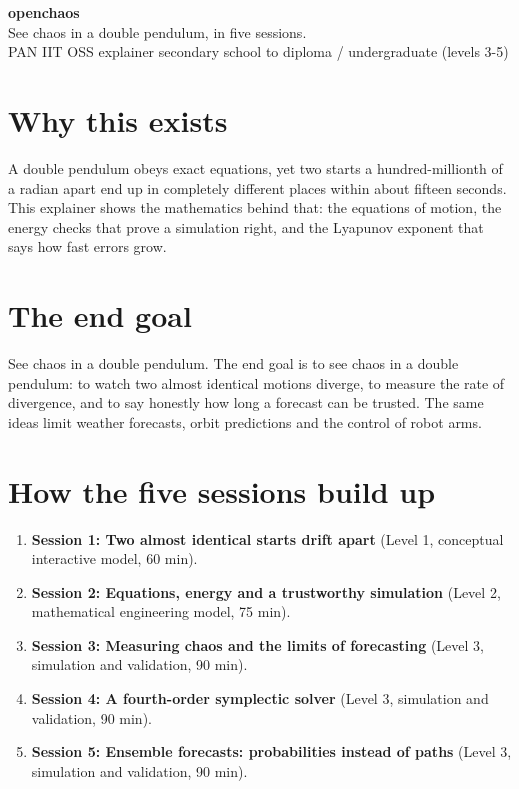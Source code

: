 \documentclass[11pt,a4paper]{article}
\begin{document}
\begin{center}{\LARGE\bfseries openchaos}\\[0.4em]{\large See chaos in a double pendulum, in five sessions.}\\[0.2em]\small PAN IIT OSS explainer \textbullet{} secondary school to diploma / undergraduate (levels 3-5)\end{center}

\section*{Why this exists}
A double pendulum obeys exact equations, yet two starts a hundred-millionth of a radian apart end up in completely different places within about fifteen seconds. This explainer shows the mathematics behind that: the equations of motion, the energy checks that prove a simulation right, and the Lyapunov exponent that says how fast errors grow.

\section*{The end goal}
See chaos in a double pendulum. The end goal is to see chaos in a double pendulum: to watch two almost identical motions diverge, to measure the rate of divergence, and to say honestly how long a forecast can be trusted. The same ideas limit weather forecasts, orbit predictions and the control of robot arms.

\section*{How the five sessions build up}
\begin{enumerate}[nosep]
\item \textbf{Session 1: Two almost identical starts drift apart} (Level 1, conceptual interactive model, 60 min).
\item \textbf{Session 2: Equations, energy and a trustworthy simulation} (Level 2, mathematical engineering model, 75 min).
\item \textbf{Session 3: Measuring chaos and the limits of forecasting} (Level 3, simulation and validation, 90 min).
\item \textbf{Session 4: A fourth-order symplectic solver} (Level 3, simulation and validation, 90 min).
\item \textbf{Session 5: Ensemble forecasts: probabilities instead of paths} (Level 3, simulation and validation, 90 min).
\end{enumerate}
\end{document}
